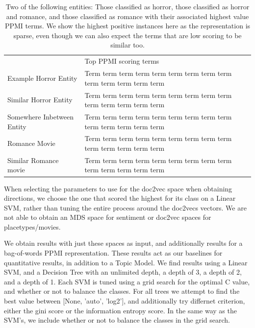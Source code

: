 \begin{table}[]
	\begin{tabular}{ll}
		& Top PPMI scoring terms                                                \\
		Example Horror Entity      & Term term term term term term term term term term term term term term \\
		Similar Horror Entity      & Term term term term term term term term term term term term term term \\
		Somewhere Inbetween Entity & Term term term term term term term term term term term term term term \\
		Romance Movie              & Term term term term term term term term term term term term term term \\
		Similar Romance movie      & Term term term term term term term term term term term term term term
	\end{tabular}
\caption{Two of the following entities: Those classified as horror, those classified as horror and romance, and those classified as romance with their associated highest value PPMI terms. We show the highest positive instances here as the representation is sparse, even though we can also expect the terms that are low scoring to be similar too.}
\label{table:PPMI_example}
\end{table}

When selecting the parameters to use for the doc2vec space when obtaining directions, we choose the one that scored the highest for its class on a Linear SVM, rather than tuning the entire process around the doc2vecs vectors.
We are not able to obtain an MDS space for sentiment or doc2vec spaces for placetypes/movies.

We obtain results with just these spaces as input, and additionally results for a bag-of-words PPMI representation. These results act as our baselines for quantitative results, in addition to a Topic Model. We find results using a Linear SVM, and a Decision Tree with an unlimited depth, a depth of 3, a depth of 2, and a depth of 1. Each SVM is tuned using a grid search for the optimal C value, and whether or not to balance the classes. For all trees we attempt to find the best value between [None, 'auto', 'log2'], and additionally try differnet criterion, either the gini score or the information entropy score. In the same way as the SVM's, we include whether or not to balance the classes in the grid search.

